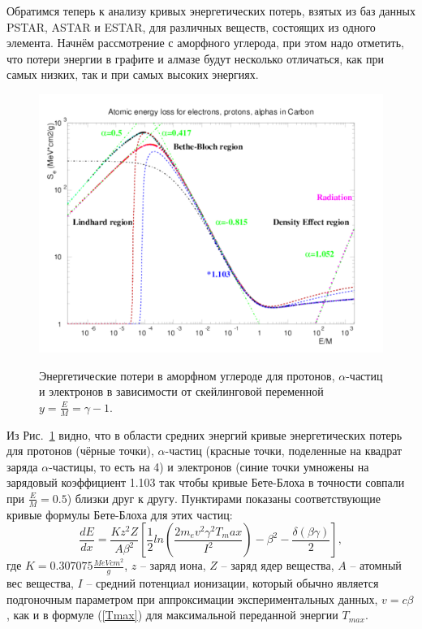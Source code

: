 \documentclass[a4paper,12pt]{article}
\begin{document}
\begin{large}
  Обратимся теперь к анализу кривых энергетических потерь, взятых из баз данных PSTAR, ASTAR и ESTAR, для различных веществ, состоящих из одного элемента.
  Начнём рассмотрение с аморфного углерода, при этом надо отметить, что потери энергии в графите и алмазе будут несколько отличаться, как при самых низких, так и при самых высоких энергиях.
  \begin{figure}[ht]
    {
       \includegraphics[width=0.99\linewidth]{images/epa_c_l}
    }
    \caption{Энергетические потери в аморфном углероде для протонов, $\alpha$-частиц и электронов в зависимости от скейлинговой переменной $y=\frac{E}{M}=\gamma-1$.}
    \label{fig:dEdxCL}
  \end{figure}
  Из Рис.~\ref{fig:dEdxCL} видно, что в области средних энергий кривые энергетических потерь для протонов (чёрные точки), $\alpha$-частиц (красные точки, поделенные на квадрат заряда $\alpha$-частицы, то есть на 4) и электронов (синие точки умножены на зарядовый коэффициент 1.103 так чтобы кривые Бете-Блоха в точности совпали при $\frac{E}{M}=0.5$) близки друг к другу.
  Пунктирами показаны соответствующие кривые формулы Бете-Блоха для этих частиц:
  \begin{equation}
  \label{BetheBloch}
    \frac{dE}{dx}=\frac{Kz^2Z}{A\beta^2}\left[\frac{1}{2}ln\left(\frac{2m_ev^2\gamma^2T_max}{I^2}\right)-\beta^2-\frac{\delta(\beta\gamma)}{2}\right],
  \end{equation}
  где $K=0.307075\frac{MeVcm^2}{g}$, $z$ -- заряд иона, $Z$ -- заряд ядер вещества, $A$ -- атомный вес вещества, $I$ -- средний потенциал ионизации, который обычно является подгоночным параметром при аппроксимации экспериментальных данных, $v=c\beta$, как и в формуле (\ref{Tmax}) для максимальной переданной энергии $T_{max}$.

\end{large}
\end{document}
